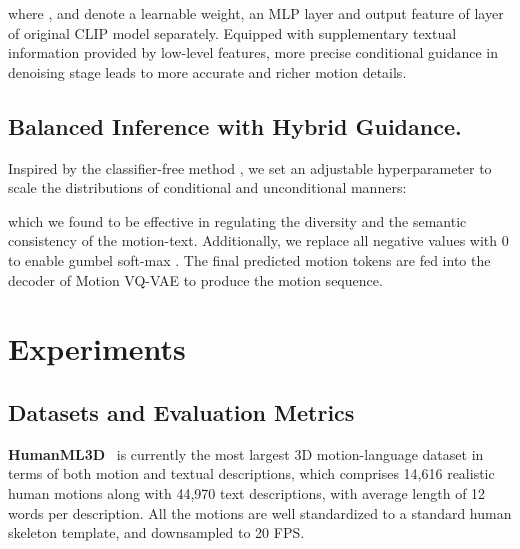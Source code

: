 \documentclass[letterpaper]{article} \usepackage{aaai24}
\begin{document}
where ,  and  denote a learnable weight, an MLP layer and output feature of  layer of original CLIP model separately. Equipped with supplementary textual information provided by low-level features, more precise conditional guidance in denoising stage leads to more accurate and richer motion details.


\subsection{Balanced Inference with Hybrid Guidance.}
Inspired by the classifier-free method \cite{ho2022classifierfree}, we set an adjustable hyperparameter  to scale the distributions of conditional and unconditional manners:

which we found to be effective in regulating the diversity and the semantic consistency of the motion-text. Additionally, we replace all negative values 
with 0 to enable gumbel soft-max \cite{jang2017categorical}. The final predicted motion tokens are fed into the decoder of Motion VQ-VAE to produce the motion sequence.








































\section{Experiments}

\subsection{Datasets and Evaluation Metrics}

\noindent\textbf{HumanML3D}~\cite{guo2022generating} is currently the most largest 3D motion-language dataset in terms of both motion and textual descriptions, which comprises 14,616 realistic human motions along with 44,970 text descriptions, with average length of 12 words per description. 
All the motions are well standardized to a standard human skeleton template, and downsampled to 20 FPS.
\end{document}
